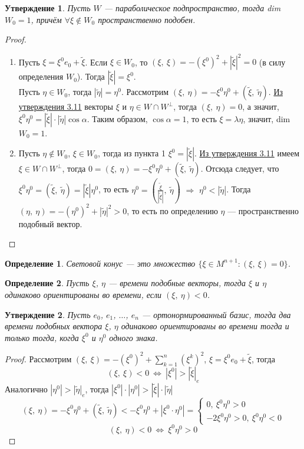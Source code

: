 \documentclass[12pt]{article}
\newcommand\tab[1][.5cm]{\hspace*{#1}}
\theoremstyle{plain}
\newtheorem{subtheorem}{Утверждение}[section]
\newtheorem{definition}{Определение}[section]
\begin{document}
    \begin{subtheorem}
        Пусть $W$ --- параболическое подпространство, тогда dim $W_0=1$, причём $\forall\xi\notin W_0$ пространственно подобен.
    \end{subtheorem}
    \begin{proof}\tab
        \begin{enumerate}
            \item Пусть $\xi=\xi^0e_0+\tilde{\xi}$. Если $\xi\in W_0$, то $(\xi, \ \xi)=-(\xi^0)^2+|\tilde{\xi}|^2=0$ (в силу определения $W_0$). Тогда $|\tilde{\xi}|=\xi^0$.\\Пусть $\eta\in W_0$, тогда $|\tilde{\eta}|=\eta^0$. Рассмотрим $(\xi, \ \eta)=-\xi^0\eta^0+(\tilde{\xi}, \ \tilde{\eta})$. \hyperlink{d15}{Из утверждения 3.11} векторы $\xi$ и $\eta\in W\cap W^{\perp}$, тогда $(\xi, \ \eta)=0$, а значит, $\xi^0\eta^0=|\tilde{\xi}|\cdot|\tilde{\eta}|\cos\alpha$. Таким образом, $\cos\alpha=1$, то есть $\xi=\lambda\eta$, значит, dim $W_0=1$.
            \item Пусть $\eta\notin W_0$, $\xi\in W_0$,  тогда из пункта 1 $\xi^0=|\tilde{\xi}|$. \hyperlink{d15}{Из утверждения 3.11} имеем $\xi\in W\cap W^{\perp}$, тогда $0=(\xi, \ \eta)=-\xi^0\eta^0+(\tilde{\xi}, \ \tilde{\eta})$. Отсюда следует, что $\xi^0\eta^0=(\tilde{\xi}, \ \tilde{\eta})=|\tilde{\xi}|\eta^0$, то есть $\eta^0=\left(\frac{\tilde{\xi}}{|\tilde{\xi}|}, \ \tilde{\eta}\right)$ $\Longrightarrow$ $\eta^0<|\tilde{\eta}|$. Тогда $(\eta, \ \eta)=-(\eta^0)^2+|\tilde{\eta}|^2>0$, то есть по определению $\eta$ --- пространственно подобный вектор.
        \end{enumerate}
    \end{proof}
    \begin{definition}
        Световой конус --- это множество $\{\xi\in M^{n+1}:(\xi, \ \xi)=0\}$.
    \end{definition}
    \begin{definition}
        Пусть $\xi$, $\eta$ --- времени подобные векторы, тогда $\xi$ и $\eta$ одинаково ориентированы во времени, если $(\xi, \ \eta)<0$.
    \end{definition}
    \begin{subtheorem}
        Пусть $e_0$, $e_1$, $\ldots$, $e_n$ --- ортонормированный базис, тогда два времени подобных вектора $\xi$, $\eta$ одинаково ориентированы во времени тогда и только тогда, когда $\xi^0$ и $\eta^0$ одного знака.
    \end{subtheorem}
    \begin{proof}
        Рассмотрим $(\xi, \ \xi)=-(\xi^0)^2+\sum\limits_{k=1}^n(\xi^k)^2$, $\xi=\xi^0e_0+\tilde{\xi}$, тогда $$(\xi, \ \xi)<0 \ \Longleftrightarrow \ |\xi^0|>|\tilde{\xi}|_e$$
        Аналогично $|\eta^0|>|\tilde{\eta}|_e$, тогда $|\xi^0|\cdot|\eta^0|>|\tilde{\xi}|\cdot|\tilde{\eta}|$
        $$(\xi, \ \eta)=-\xi^0\eta^0+(\tilde{\xi}, \ \tilde{\eta})<-\xi^0\eta^0+|\xi^0\cdot\eta^0|=\begin{cases}
            0, \ \xi^0\eta^0>0\\
            -2\xi^0\eta^0>0, \ \xi^0\eta^0<0
        \end{cases}$$
        $$(\xi, \ \eta)<0 \ \Longleftrightarrow \ \xi^0\eta^0>0$$
    \end{proof}
\end{document}
